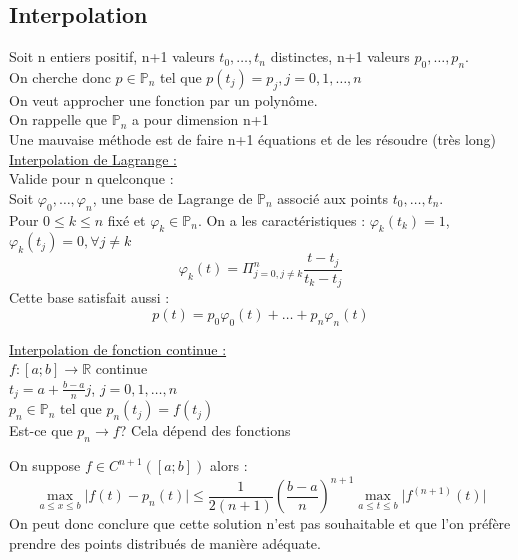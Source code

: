 \documentclass[../main.tex]{subfiles}
\begin{document}
\localtableofcontents
\subsection{Interpolation}
Soit n entiers positif, n+1 valeurs $t_0, \dots, t_n$ distinctes, n+1 valeurs $p_0, \dots, p_n$.\\
On cherche donc $p\in \mathbb{P}_n$ tel que $p(t_j) = p_j, j=0,1,\dots, n$\\

On veut approcher une fonction par un polynôme.\\
On rappelle que $\mathbb{P}_n$ a pour dimension n+1\\
Une mauvaise méthode est de faire n+1 équations et de les résoudre (très long)\\

\quad \underline{Interpolation de Lagrange :}\\
Valide pour n quelconque : \\
Soit $\varphi_0, \dots, \varphi_n$, une base de Lagrange de $\mathbb{P}_n$ associé aux points $t_0, \dots, t_n$.\\
Pour $0\leq k \leq n$ fixé et $\varphi_k \in \mathbb{P}_n$. On a les caractéristiques : $\varphi_k(t_k) = 1$, $\varphi_k(t_j) = 0, \forall j\neq k$\\
\begin{equation}
    \varphi_k(t) = \Pi_{j=0, j\neq k}^n \frac{t-t_j}{t_k-t_j}
\end{equation}
Cette base satisfait aussi :\\
\begin{equation}
    p(t) = p_0 \varphi_0(t) + \dots + p_n \varphi_n(t)
\end{equation}

\quad \underline{Interpolation de fonction continue :}\\
$f:[a;b] \rightarrow \mathbb{R}$ continue\\
$t_j = a +\frac{b-a}{n} j $, $j=0,1,\dots, n$\\
$p_n \in \mathbb{P}_n$ tel que $p_n(t_j) = f(t_j)$\\
Est-ce que $p_n \rightarrow f$? Cela dépend des fonctions\\

\begin{theorem}
On suppose $f\in C^{n+1}([a;b])$ alors :\\
\begin{equation}
    \max_{a\leq x\leq b} \lvert f(t) - p_n(t)\rvert \leq \frac{1}{2(n+1)} (\frac{b-a}{n})^{n+1} \max_{a\leq t\leq b} \lvert f^{(n+1)}(t)\rvert
\end{equation}
On peut donc conclure que cette solution n'est pas souhaitable et que l'on préfère prendre des points distribués de manière adéquate.
\end{theorem}
\end{document}
